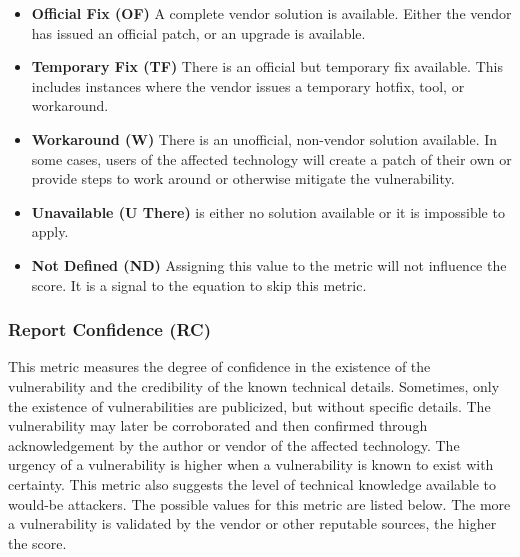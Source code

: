     \begin{itemize}
      \item
        \textbf{Official Fix (OF)} A complete vendor solution is available.
        Either the vendor has issued an official patch, or an upgrade is
        available.
      \item
        \textbf{Temporary Fix (TF)} There is an official but temporary fix
        available. This includes instances where the vendor issues a temporary
        hotfix, tool, or workaround.
      \item
        \textbf{Workaround (W)} There is an unofficial, non-vendor solution
        available. In some cases, users of the affected technology will create
        a patch of their own or provide steps to work around or otherwise
        mitigate the vulnerability.
      \item
        \textbf{Unavailable (U There)} is either no solution available or it is
        impossible to apply.
      \item
        \textbf{Not Defined (ND)} Assigning this value to the metric will not
        influence the score. It is a signal to the equation to skip this
        metric.
    \end{itemize}

    \subsubsection{Report Confidence (RC)}\label{subsec:report-confidence-rc}

    This metric measures the degree of confidence in the existence of the
    vulnerability and the credibility of the known technical details.
    Sometimes, only the existence of vulnerabilities are publicized, but
    without specific details. The vulnerability may later be corroborated
    and then confirmed through acknowledgement by the author or vendor of
    the affected technology. The urgency of a vulnerability is higher when a
    vulnerability is known to exist with certainty. This metric also
    suggests the level of technical knowledge available to would-be
    attackers. The possible values for this metric are listed below.
    The more a vulnerability is validated by the vendor or other reputable
    sources, the higher the score.

